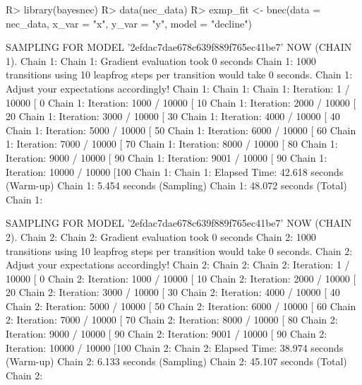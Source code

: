 \documentclass[
]{jss}
\begin{document}
\begin{CodeChunk}
\begin{CodeInput}
R> library(bayesnec)
R> data(nec_data)
R> exmp_fit <- bnec(data = nec_data, x_var = "x", y_var = "y", model = "decline")
\end{CodeInput}
\begin{CodeOutput}

SAMPLING FOR MODEL '2efdac7dae678c639f889f765ec41be7' NOW (CHAIN 1).
Chain 1: 
Chain 1: Gradient evaluation took 0 seconds
Chain 1: 1000 transitions using 10 leapfrog steps per transition would take 0 seconds.
Chain 1: Adjust your expectations accordingly!
Chain 1: 
Chain 1: 
Chain 1: Iteration:    1 / 10000 [  0%
Chain 1: Iteration: 1000 / 10000 [ 10%
Chain 1: Iteration: 2000 / 10000 [ 20%
Chain 1: Iteration: 3000 / 10000 [ 30%
Chain 1: Iteration: 4000 / 10000 [ 40%
Chain 1: Iteration: 5000 / 10000 [ 50%
Chain 1: Iteration: 6000 / 10000 [ 60%
Chain 1: Iteration: 7000 / 10000 [ 70%
Chain 1: Iteration: 8000 / 10000 [ 80%
Chain 1: Iteration: 9000 / 10000 [ 90%
Chain 1: Iteration: 9001 / 10000 [ 90%
Chain 1: Iteration: 10000 / 10000 [100%
Chain 1: 
Chain 1:  Elapsed Time: 42.618 seconds (Warm-up)
Chain 1:                5.454 seconds (Sampling)
Chain 1:                48.072 seconds (Total)
Chain 1: 

SAMPLING FOR MODEL '2efdac7dae678c639f889f765ec41be7' NOW (CHAIN 2).
Chain 2: 
Chain 2: Gradient evaluation took 0 seconds
Chain 2: 1000 transitions using 10 leapfrog steps per transition would take 0 seconds.
Chain 2: Adjust your expectations accordingly!
Chain 2: 
Chain 2: 
Chain 2: Iteration:    1 / 10000 [  0%
Chain 2: Iteration: 1000 / 10000 [ 10%
Chain 2: Iteration: 2000 / 10000 [ 20%
Chain 2: Iteration: 3000 / 10000 [ 30%
Chain 2: Iteration: 4000 / 10000 [ 40%
Chain 2: Iteration: 5000 / 10000 [ 50%
Chain 2: Iteration: 6000 / 10000 [ 60%
Chain 2: Iteration: 7000 / 10000 [ 70%
Chain 2: Iteration: 8000 / 10000 [ 80%
Chain 2: Iteration: 9000 / 10000 [ 90%
Chain 2: Iteration: 9001 / 10000 [ 90%
Chain 2: Iteration: 10000 / 10000 [100%
Chain 2: 
Chain 2:  Elapsed Time: 38.974 seconds (Warm-up)
Chain 2:                6.133 seconds (Sampling)
Chain 2:                45.107 seconds (Total)
Chain 2: 


\end{CodeOutput}
\end{CodeChunk}
\end{document}

